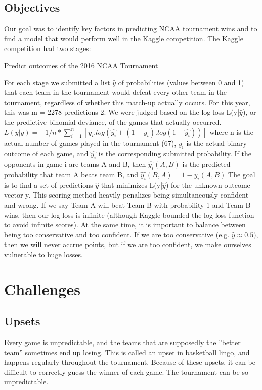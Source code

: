 \documentclass{article}
\begin{document}
\begin{multicols}{2}
    \subsection{Objectives}
    Our goal was to identify key factors in predicting NCAA tournament wins and to find a
model that would perform well in the Kaggle competition.
The Kaggle competition had two stages:
\begin{list}{•}{•}
\item Predict outcomes of the 2016 NCAA Tournament
\end{list}
    For each stage we submitted a list $\hat{y}$ of probabilities (values between 0 and 1) that each team in the tournament would defeat every other team in the tournament, regardless of whether this match-up actually occurs. For this year, this was m = 2278 predictions 2. We were judged based on the log-loss L(y|$\hat{y}$), or the predictive binomial deviance, of the games that actually occurred.
    \linebreak 
    \linebreak 
    $L(y|\hat{y}) = -1/n * \sum_{i=1}^{n}[y_i.log(\hat{y_i} + (1-y_i). log(1-\hat{y_i}))]$ where n is the actual number of games played in the tournament (67), $y_i$ is the actual binary outcome of each game, and $\hat{y_i}$ is the corresponding submitted probability. If the opponents in game i are teams A and B, then $\hat{y_i}(A,B)$ is the predicted probability that team A beats team B, and $\hat{y_i}(B,A)=1-\hat{y_i}(A,B)$
   \linebreak
   \linebreak
   The goal is to find a set of predictions $\hat{y}$ that minimizes L(y|$\hat{y}$) for the unknown outcome vector y. This scoring method heavily penalizes being simultaneously confident and wrong. If we say Team A will beat Team B with probability 1 and Team B wins, then our log-loss is infinite (although Kaggle bounded the log-loss function to avoid infinite scores). At the same time, it is important to balance between being too conservative and too confident. If we are too conservative (e.g. $\hat{y} \approx 0.5)$, then we will never accrue points, but if we are too confident, we make ourselves vulnerable to huge losses.\cite{1}

	\section{Challenges}
	\subsection{Upsets}
	Every game is unpredictable, and the teams that are supposedly the ”better team” sometimes end up losing. This
is called an upset in basketball lingo, and happens regularly throughout the tournament. Because of these upsets, it can be difficult to correctly guess the winner of each game. The tournament can be so unpredictable.\cite{2}


\end{multicols}
\end{document}
